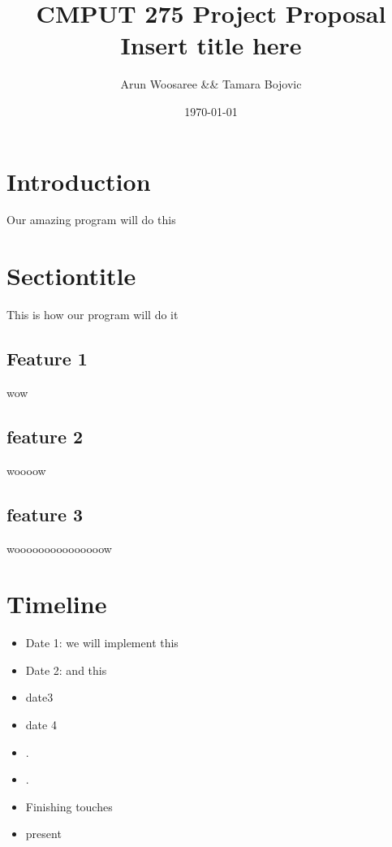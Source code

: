 \documentclass{article}
\title{CMPUT 275 Project Proposal\\
\vspace{.25cm}\large Insert title here \vspace{-.5cm}}
\author{\LARGE Arun Woosaree  \&\& Tamara Bojovic}
\date{\today}
\begin{document}
  \maketitle %
  \section{Introduction}
  Our amazing program will do this

  \section{Sectiontitle}
  This is how our program will do it

    \subsection{Feature 1}
    wow

    \subsection{feature 2}
    woooow

    \subsection{feature 3}
    wooooooooooooooow


  \section{Timeline}

  \begin{itemize}
    \item Date 1: we will implement this
    \item Date 2: and this
    \item date3
    \item date 4
    \item .
    \item.
    \item Finishing touches
    \item present
  \end{itemize}
\end{document}
